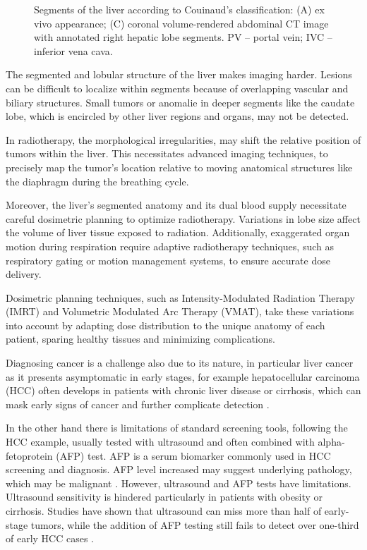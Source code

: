\documentclass[11pt]{article} %
\begin{document}
\begin{multicols}{2}
\begin{figure}[H]
\begin{subfigure}[t]{0.25\textwidth}
		\caption{}
		\label{fig:figure-c}
	\end{subfigure}
	\caption{Segments of the liver according to Couinaud’s classification: (A) ex vivo appearance; (C) coronal volume-rendered abdominal CT image with annotated right hepatic lobe segments. PV – portal vein; IVC – inferior vena cava.}
	\label{fig:liver-segments-side-by-side}
\end{figure}

The segmented and lobular structure of the liver makes imaging harder. Lesions can be difficult to localize within segments because of overlapping vascular and biliary structures. Small tumors or anomalie in deeper segments like the caudate lobe, which is encircled by other liver regions and  organs, may not be detected. \cite{WJGnet2023,liverMassCharacterization2023}

In radiotherapy, the morphological irregularities, may shift the relative position of tumors within the liver. This necessitates advanced imaging techniques, to precisely map the tumor’s location relative to moving anatomical structures like the diaphragm during the breathing cycle. \cite{luersen2015}

Moreover, the liver’s segmented anatomy and its dual blood supply necessitate careful dosimetric planning to optimize radiotherapy. Variations in lobe size affect the volume of liver tissue exposed to radiation. Additionally, exaggerated organ motion during respiration require adaptive radiotherapy techniques, such as respiratory gating or motion management systems, to ensure accurate dose delivery.\cite{pmc5658876}

Dosimetric planning techniques, such as Intensity-Modulated Radiation Therapy (IMRT) and Volumetric Modulated Arc Therapy (VMAT), take these variations into account by adapting dose distribution to the unique anatomy of each patient, sparing healthy tissues and minimizing complications. \cite{oymak2022}

Diagnosing cancer is a challenge also due to its nature, in particular liver cancer as it presents asymptomatic in early stages, for example hepatocellular carcinoma (HCC) often develops in patients with chronic liver disease or cirrhosis, which can mask early signs of cancer and further complicate detection \cite{quaglia2018,doi:10.1148/radiol.14132362}.

In the other hand there is limitations of standard screening tools, following the HCC example, usually tested with ultrasound and often combined with alpha-fetoprotein (AFP) test. AFP is a serum biomarker commonly used in HCC screening and diagnosis. AFP level increased may suggest underlying pathology, which may be malignant \cite{bialecki2005}.
However, ultrasound and AFP tests have limitations. Ultrasound sensitivity is hindered particularly in patients with obesity or cirrhosis.\cite{floridi2022} Studies have shown that ultrasound can miss more than half of early-stage tumors, while the addition of AFP testing still fails to detect over one-third of early HCC cases \cite{mcmahon2023}.


\end{multicols}
\end{document}
